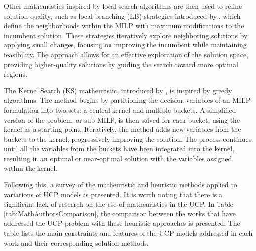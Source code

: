 Other matheuristics inspired by local search algorithms are then used to refine solution quality, such as local branching (LB) strategies introduced by \citet{Fischetti2003}, which define the neighborhoods within the MILP with maximum modifications to the incumbent solution. These strategies iteratively explore neighboring solutions by applying small changes, focusing on improving the incumbent while maintaining feasibility. The approach allows for an effective exploration of the solution space, providing higher-quality solutions by guiding the search toward more optimal regions.

The Kernel Search (KS) matheuristic, introduced by \citet{Angelelli2010}, is inspired by greedy algorithms. The method begins by partitioning the decision variables of an MILP formulation into two sets: a central kernel and multiple buckets. A simplified version of the problem, or sub-MILP, is then solved for each bucket, using the kernel as a starting point. Iteratively, the method adds new variables from the buckets to the kernel, progressively improving the solution. The process continues until all the variables from the buckets have been integrated into the kernel, resulting in an optimal or near-optimal solution with the variables assigned within the kernel.

Following this, a survey of the matheuristic and heuristic methods applied to variations of UCP models is presented. It is worth noting that there is a significant lack of research on the use of matheuristics in the UCP. In Table \ref{tab:MathAuthorsComparison}, the comparison between the works that have addressed the UCP problem with these heuristic approaches is presented. The table lists the main constraints and features of the UCP models addressed in each work and their corresponding solution methods.




